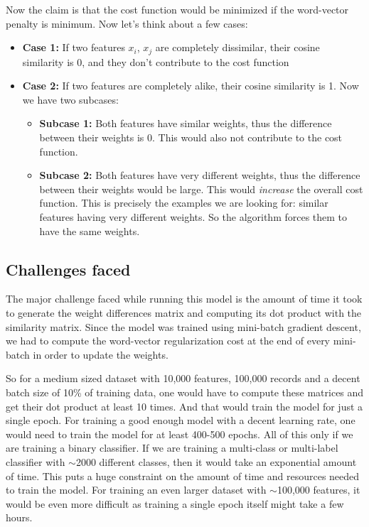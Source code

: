 Now the claim is that the cost function would be minimized if the word-vector penalty is minimum. Now let's think about a few cases: 

\begin{itemize}
    \item \textbf{Case 1:} If two features $x_{i}$, $x_{j}$ are completely dissimilar, their cosine similarity is 0, and they don't contribute to the cost function
    \item \textbf{Case 2:} If two features are completely alike, their cosine similarity is 1. Now we have two subcases:
    \begin{itemize}
        \item \textbf{Subcase 1:} Both features have similar weights, thus the difference between their weights is 0. This would also not contribute to the cost function.
        
        \item \textbf{Subcase 2:} Both features have very different weights, thus the difference between their weights would be large. This would \textit{increase} the overall cost function. This is precisely the examples we are looking for: similar features having very different weights. So the algorithm forces them to have the same weights.
    \end{itemize}
\end{itemize}

\subsection{Challenges faced}

The major challenge faced while running this model is the amount of time it took to generate the weight differences matrix and computing its dot product with the similarity matrix. Since the model was trained using mini-batch gradient descent, we had to compute the word-vector regularization cost at the end of every mini-batch in order to update the weights. 

So for a medium sized dataset with 10,000 features, 100,000 records and a decent batch size of 10\% of training data, one would have to compute these matrices and get their dot product at least 10 times. And that would train the model for just a single epoch. For training a good enough model with a decent learning rate, one would need to train the model for at least 400-500 epochs. All of this only if we are training a binary classifier. If we are training a multi-class or multi-label classifier with $\sim$2000 different classes, then it would take an exponential amount of time. This puts a huge constraint on the amount of time and resources needed to train the model. For training an even larger dataset with $\sim$100,000 features, it would be even more difficult as training a single epoch itself might take a few hours.

